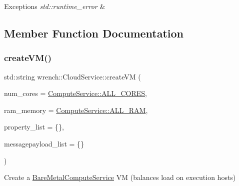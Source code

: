 \begin{DoxyExceptions}{Exceptions}
{\em std\+::runtime\+\_\+error} & \\
\hline
\end{DoxyExceptions}


\subsection{Member Function Documentation}
\mbox{\label{classwrench_1_1_cloud_service_a6e614c2edbe303de83a47c024e84e250}} 
\subsubsection{\texorpdfstring{create\+V\+M()}{createVM()}}
{\footnotesize\ttfamily std\+::string wrench\+::\+Cloud\+Service\+::create\+VM (\begin{DoxyParamCaption}\item[{unsigned long}]{num\+\_\+cores = {\ttfamily \hyperlink{classwrench_1_1_compute_service_a1160f521623440ad4e0e0823e08a7d22}{Compute\+Service\+::\+A\+L\+L\+\_\+\+C\+O\+R\+ES}},  }\item[{double}]{ram\+\_\+memory = {\ttfamily \hyperlink{classwrench_1_1_compute_service_abc4fe0bad59f544b4b34d0e7d4012d44}{Compute\+Service\+::\+A\+L\+L\+\_\+\+R\+AM}},  }\item[{std\+::map$<$ std\+::string, std\+::string $>$}]{property\+\_\+list = {\ttfamily \{\}},  }\item[{std\+::map$<$ std\+::string, std\+::string $>$}]{messagepayload\+\_\+list = {\ttfamily \{\}} }\end{DoxyParamCaption})\hspace{0.3cm}{\ttfamily [virtual]}}



Create a \hyperlink{classwrench_1_1_bare_metal_compute_service}{Bare\+Metal\+Compute\+Service} VM (balances load on execution hosts) 


